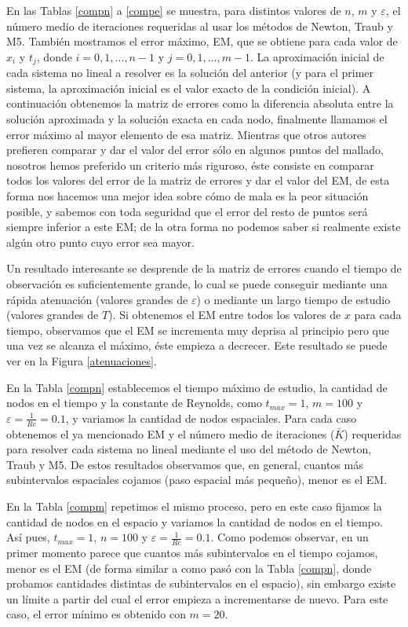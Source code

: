 En las Tablas \ref{compn} a \ref{compe} se muestra, para distintos valores de $n$, $m$
y $\varepsilon$, el número medio de iteraciones requeridas al usar los métodos de Newton, Traub y M5. También mostramos el error máximo, EM, que se obtiene para cada valor de $x_i$ y $t_j$, donde $i=0,1,...,n-1$ y $j=0,1,...,m-1$. La aproximación inicial de cada sistema no lineal a resolver es la solución del anterior (y para el primer sistema, la aproximación inicial es el valor exacto de la condición inicial). A continuación obtenemos la matriz de errores como la diferencia absoluta entre la solución aproximada y la solución exacta en cada nodo, finalmente llamamos el error máximo al mayor elemento de esa matriz. Mientras que otros autores prefieren comparar y dar el valor del error sólo en algunos puntos del mallado, nosotros hemos preferido un criterio más riguroso, éste consiste en comparar todos los valores del error de la matriz de errores y dar el valor del EM, de esta forma nos hacemos una mejor idea sobre cómo de mala es la peor situación posible, y sabemos con toda seguridad que el error del resto de puntos será siempre inferior a este EM; de la otra forma no podemos saber si realmente existe algún otro punto cuyo error sea mayor.

Un resultado interesante se desprende de la matriz de errores cuando el tiempo de observación es suficientemente grande, lo cual se puede conseguir mediante una rápida atenuación (valores grandes de $\varepsilon$) o mediante un largo tiempo de estudio (valores grandes de $T$). Si obtenemos el EM entre todos los valores de $x$ para cada tiempo, observamos que el EM se incrementa muy deprisa al principio pero que una vez se alcanza el máximo, éste empieza a decrecer. Este resultado se puede ver en la Figura \ref{atenuaciones}.

En la Tabla \ref{compn} establecemos el tiempo máximo de estudio, la cantidad de nodos en el tiempo y la constante de Reynolds, como $t_{max}=1$,
$m=100$ y $\varepsilon =\frac{1}{Re}=0.1$, y variamos la cantidad de nodos espaciales. Para cada caso obtenemos el ya mencionado EM y el número medio de iteraciones ($\bar{K}$) requeridas para resolver cada sistema no lineal mediante el uso del método de Newton, Traub y M5. De estos resultados observamos que, en general, cuantos más subintervalos espaciales cojamos (paso espacial más pequeño), menor es el EM.

En la Tabla \ref{compm} repetimos el mismo proceso, pero en este caso fijamos la cantidad de nodos en el espacio y variamos la cantidad de nodos en el tiempo. Así pues, $t_{max}=1$, $n=100$ y $\varepsilon =\frac{1}{Re}=0.1$. Como podemos observar, en un primer momento parece que cuantos más subintervalos en el tiempo cojamos, menor es el EM (de forma similar a como pasó con la Tabla \ref{compn}, donde probamos cantidades distintas de subintervalos en el espacio), sin embargo existe un límite a partir del cual el error empieza a incrementarse de nuevo. Para este caso, el error mínimo es obtenido con $m=20$.


